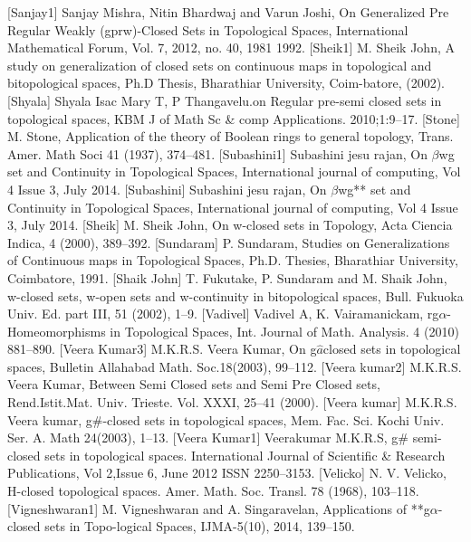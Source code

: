 \begin{thebibliography}{99}
 [Sanjay1] Sanjay Mishra, Nitin Bhardwaj and Varun Joshi, On Generalized Pre Regular Weakly (gprw)-Closed Sets in Topological Spaces, International Mathematical Forum, Vol. 7, 2012, no. 40, 1981 1992.
 [Sheik1] M. Sheik John, A study on generalization of closed sets on continuous maps in topological and bitopological spaces, Ph.D Thesis, Bharathiar University, Coim-batore, (2002).
 [Shyala] Shyala Isac Mary T, P Thangavelu.on Regular pre-semi closed sets in topological spaces, KBM J of Math Sc \& comp Applications. 2010;1:9--17.
 [Stone] M. Stone, Application of the theory of Boolean rings to general topology, Trans. Amer. Math Soci  41 (1937), 374--481.
 [Subashini1] Subashini jesu rajan, On $\beta$wg set and Continuity in Topological Spaces, International journal of computing, Vol 4 Issue 3, July 2014.
 [Subashini] Subashini jesu rajan, On $\beta$wg** set and Continuity in Topological Spaces, International journal of  computing, Vol 4 Issue 3, July 2014.
 [Sheik] M. Sheik John, On w-closed sets in Topology, Acta Ciencia Indica, 4 (2000), 389--392.
 [Sundaram] P. Sundaram, Studies on Generalizations of Continuous maps in Topological Spaces, Ph.D. Thesies, Bharathiar University, Coimbatore, 1991.
 [Shaik John] T. Fukutake, P. Sundaram and M. Shaik John, w-closed sets, w-open sets and w-continuity in bitopological spaces, Bull. Fukuoka Univ. Ed. part III, 51 (2002), 1--9.
 [Vadivel] Vadivel A, K. Vairamanickam, rg$\alpha$-Homeomorphisms in Topological Spaces, Int. Journal of Math. Analysis. 4 (2010) 881--890. 
 [Veera Kumar3] M.K.R.S. Veera Kumar, On g$\hat{a}$closed sets in topological spaces, Bulletin Allahabad Math. Soc.18(2003),  99--112.
 [Veera kumar2] M.K.R.S. Veera Kumar, Between Semi Closed sets and Semi Pre Closed sets, Rend.Istit.Mat. Univ. Trieste. Vol. XXXI, 25--41 (2000).
 [Veera kumar] M.K.R.S. Veera kumar, g\#-closed sets in topological spaces, Mem. Fac. Sci. Kochi Univ. Ser. A. Math 24(2003), 1--13. 
 [Veera Kumar1] Veerakumar M.K.R.S, g\# semi-closed sets in topological spaces. International Journal of Scientific \& Research Publications, Vol 2,Issue 6, June 2012 ISSN 2250--3153.
  [Velicko] N. V. Velicko, H-closed topological spaces. Amer. Math. Soc. Transl. 78 (1968), 103--118.
 [Vigneshwaran1] M. Vigneshwaran and A. Singaravelan, Applications of {*}{*}g$\alpha$-closed sets in Topo-logical Spaces, IJMA-5(10), 2014, 139--150.

\end{thebibliography}

